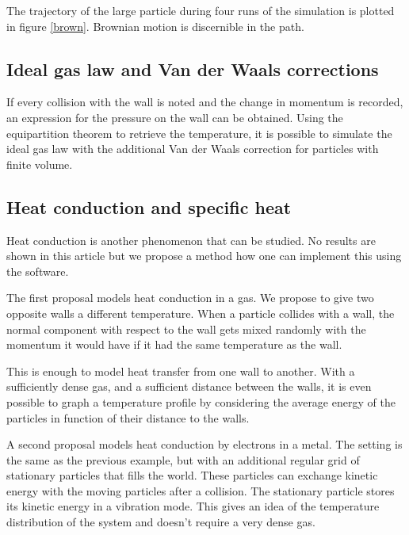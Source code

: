 The trajectory of the large particle during four runs of the simulation is 
plotted in figure \ref{brown}. Brownian motion is discernible in the path.




\subsection{Ideal gas law and Van der Waals corrections}

If every collision with the wall is noted and the change in momentum is 
recorded, an expression for the pressure on the wall can be obtained. Using 
the equipartition theorem to retrieve the temperature, it is possible to 
simulate the ideal gas law with the additional Van der Waals correction for 
particles with finite volume.


\subsection{Heat conduction and specific heat}

Heat conduction is another phenomenon that can be studied. No results are shown 
in this article but we propose a method how one can implement this using the 
software.

The first proposal models heat conduction in a gas. We propose to give two 
opposite walls a different temperature. When a particle collides with a 
wall, the normal component with respect to the wall gets mixed randomly 
with the momentum it would have if it had the same temperature as the wall.  

This is enough to model heat transfer from one wall to another. With a 
sufficiently dense gas, and a sufficient distance between the walls, it is 
even possible to graph a temperature profile by considering the average 
energy of the particles in function of their distance to the walls.

A second proposal models heat conduction by electrons in a metal. The 
setting is the same as the previous example, but with an additional regular 
grid of stationary particles that fills the world. These particles can 
exchange kinetic energy with the moving particles after a collision. The 
stationary particle stores its kinetic energy in a vibration mode. This 
gives an idea of the temperature distribution of the system and doesn't 
require a very dense gas.

